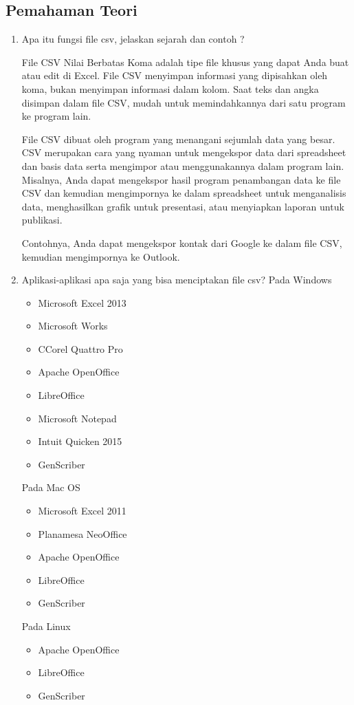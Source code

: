 \subsection{Pemahaman Teori}
\begin{enumerate}
    \item Apa itu fungsi file csv, jelaskan sejarah dan contoh ?
    \par
    File CSV Nilai Berbatas Koma adalah tipe file khusus yang dapat Anda buat atau edit di Excel. File CSV menyimpan informasi yang dipisahkan oleh koma, bukan menyimpan informasi dalam kolom. Saat teks dan angka disimpan dalam file CSV, mudah untuk memindahkannya dari satu program ke program lain.
    \par 
	File CSV dibuat oleh program yang menangani sejumlah data yang besar. CSV merupakan cara yang nyaman untuk mengekspor data dari spreadsheet dan basis data serta mengimpor atau menggunakannya dalam program lain. Misalnya, Anda dapat mengekspor hasil program penambangan data ke file CSV dan kemudian mengimpornya ke dalam spreadsheet untuk menganalisis data, menghasilkan grafik untuk presentasi, atau menyiapkan laporan untuk publikasi.
    \par
	Contohnya, Anda dapat mengekspor kontak dari Google ke dalam file CSV, kemudian mengimpornya ke Outlook.
    
    \item Aplikasi-aplikasi apa saja yang bisa menciptakan file csv?
    Pada Windows
    \begin{itemize}
        \item Microsoft Excel 2013
        \item Microsoft Works
        \item CCorel Quattro Pro
        \item Apache OpenOffice
        \item LibreOffice
        \item Microsoft Notepad
        \item Intuit Quicken 2015
        \item GenScriber
    \end{itemize}
    Pada Mac OS
    \begin{itemize}
        \item Microsoft Excel 2011
        \item Planamesa NeoOffice
        \item Apache OpenOffice
        \item LibreOffice
        \item GenScriber
    \end{itemize}
    Pada Linux
    \begin{itemize}
        \item Apache OpenOffice
        \item LibreOffice
        \item GenScriber
    \end{itemize}
    

\end{enumerate}
